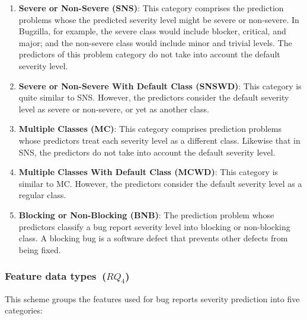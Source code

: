 \begin{enumerate}[label=\alph*., leftmargin=1.2cm]
  \item \textbf{Severe or Non-Severe (SNS)}: This category comprises the prediction problems whose the predicted severity level might be severe or non-severe. In Bugzilla, for example, the severe class would include blocker, critical, and major; and the non-severe class would include minor and trivial levels. The predictors of this problem category do not take into account the default severity level.
  
  \item \textbf{Severe or Non-Severe With Default Class (SNSWD)}: This category is quite similar to SNS. However, the predictors consider the default severity level as severe or non-severe, or yet as another class.
  
  \item \textbf{Multiple Classes (MC)}: This category comprises prediction problems whose predictors treat each severity level as a different class. Likewise that in SNS, the predictors do not take into account the default severity level.
  
  \item \textbf{Multiple Classes With Default Class (MCWD)}: This category is similar to MC. However, the predictors consider the default severity level as a regular class.
  \item \textbf{Blocking or Non-Blocking (BNB)}: The prediction problem whose predictors classify a bug report severity level into blocking or non-blocking class. A blocking bug is a software defect that prevents other defects from being fixed\cite{Valdivia:2014}. 
\end{enumerate}


\subsubsection{Feature data types~($RQ_4$)}
This scheme groups the features used for bug reports severity prediction into five categories: 

